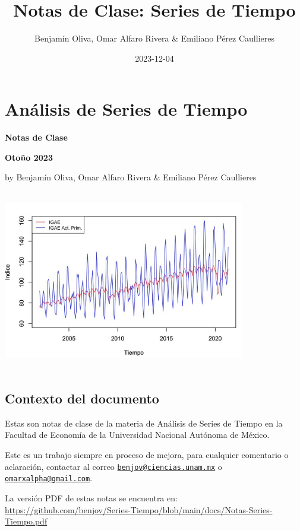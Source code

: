 \documentclass[
]{book}
\title{Notas de Clase: Series de Tiempo}
\author{Benjamín Oliva, Omar Alfaro Rivera \& Emiliano Pérez Caullieres}
\date{2023-12-04}
\begin{document}
\maketitle

{
\setcounter{tocdepth}{1}
\tableofcontents
}
\hypertarget{anuxe1lisis-de-series-de-tiempo}{%
\chapter*{Análisis de Series de Tiempo}\label{anuxe1lisis-de-series-de-tiempo}}

\textbf{Notas de Clase}

\textbf{Otoño 2023}

by Benjamín Oliva, Omar Alfaro Rivera \& Emiliano Pérez Caullieres

\includegraphics[width=4.16667in,height=3.125in]{Portada.png}

\hypertarget{contexto-del-documento}{%
\section*{Contexto del documento}\label{contexto-del-documento}}

Estas son notas de clase de la materia de Análisis de Series de Tiempo en la Facultad de Economía de la Universidad Nacional Autónoma de México.

Este es un trabajo siempre en proceso de mejora, para cualquier comentario o aclaración, contactar al correo \href{mailto:benjov@ciencias.unam.mx}{\nolinkurl{benjov@ciencias.unam.mx}} o \href{mailto:omarxalpha@gmail.com}{\nolinkurl{omarxalpha@gmail.com}}.

La versión PDF de estas notas se encuentra en: \url{https://github.com/benjov/Series-Tiempo/blob/main/docs/Notas-Series-Tiempo.pdf}
\end{document}
